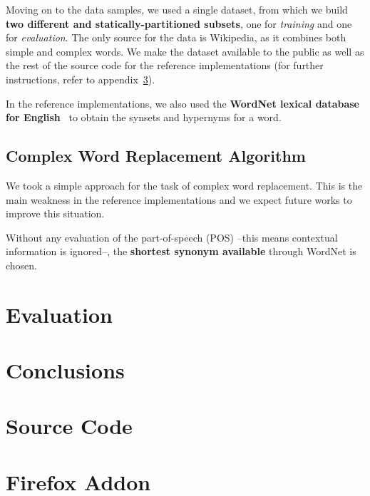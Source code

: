 \documentclass[11pt,a4paper]{article}
\begin{document}
Moving on to the data samples, we used a single dataset, from which we build \textbf{two different and statically-partitioned subsets}, one for \emph{training} and one for \emph{evaluation}. The only source for the data is Wikipedia, as it combines both simple and complex words. We make the dataset available to the public as well as the rest of the source code for the reference implementations (for further instructions, refer to appendix~\ref{sec:src}).

In the reference implementations, we also used the \textbf{WordNet lexical database for English}~\cite{miller1995wordnet} to obtain the synsets and hypernyms for a word.

\subsection{Complex Word Replacement Algorithm}

We took a simple approach for the task of complex word replacement. This is the main weakness in the reference implementations and we expect future works to improve this situation.

Without any evaluation of the part-of-speech (POS) –this means contextual information is ignored–, the \textbf{shortest synonym available} through WordNet is chosen.

\section{Evaluation}

\section{Conclusions}




\appendix

\section{Source Code}
\label{sec:src}

\section{Firefox Addon}
\label{sec:mfx}
\end{document}
